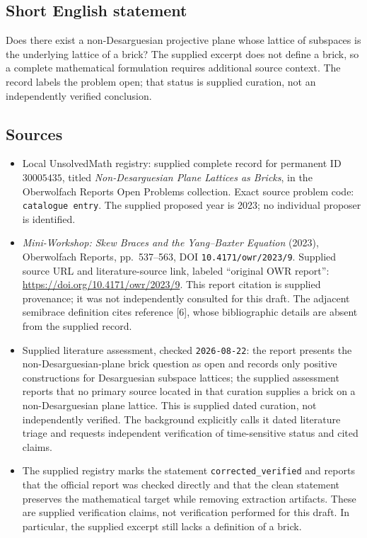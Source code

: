 \documentclass[11pt]{article}
\begin{document}
\subsection{Short English statement}
Does there exist a non-Desarguesian projective plane whose lattice of subspaces is the underlying lattice of a brick? The supplied excerpt does not define a brick, so a complete mathematical formulation requires additional source context. The record labels the problem open; that status is supplied curation, not an independently verified conclusion.
\subsection{Sources}
\begin{itemize}
\item Local UnsolvedMath registry: supplied complete record for permanent ID \(30005435\), titled \emph{Non-Desarguesian Plane Lattices as Bricks}, in the Oberwolfach Reports Open Problems collection. Exact source problem code: \texttt{catalogue entry}. The supplied proposed year is 2023; no individual proposer is identified.
\item \emph{Mini-Workshop: Skew Braces and the Yang--Baxter Equation} (2023), Oberwolfach Reports, pp.~537--563, DOI \texttt{10.4171/owr/2023/9}. Supplied source URL and literature-source link, labeled ``original OWR report'': \url{https://doi.org/10.4171/owr/2023/9}. This report citation is supplied provenance; it was not independently consulted for this draft. The adjacent semibrace definition cites reference [6], whose bibliographic details are absent from the supplied record.
\item Supplied literature assessment, checked \texttt{2026-08-22}: the report presents the non-Desarguesian-plane brick question as open and records only positive constructions for Desarguesian subspace lattices; the supplied assessment reports that no primary source located in that curation supplies a brick on a non-Desarguesian plane lattice. This is supplied dated curation, not independently verified. The background explicitly calls it dated literature triage and requests independent verification of time-sensitive status and cited claims.
\item The supplied registry marks the statement \texttt{corrected\_verified} and reports that the official report was checked directly and that the clean statement preserves the mathematical target while removing extraction artifacts. These are supplied verification claims, not verification performed for this draft. In particular, the supplied excerpt still lacks a definition of a brick.
\end{itemize}
\end{document}
